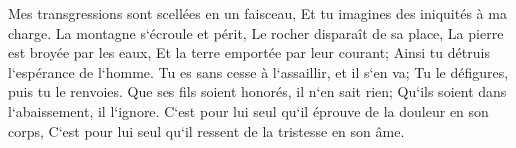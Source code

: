 \verse Mes transgressions sont scellées en un faisceau, Et tu imagines des iniquités à ma charge. 
\verse La montagne s`écroule et périt, Le rocher disparaît de sa place, 
\verse La pierre est broyée par les eaux, Et la terre emportée par leur courant; Ainsi tu détruis l`espérance de l`homme. 
\verse Tu es sans cesse à l`assaillir, et il s`en va; Tu le défigures, puis tu le renvoies. 
\verse Que ses fils soient honorés, il n`en sait rien; Qu`ils soient dans l`abaissement, il l`ignore. 
\verse C`est pour lui seul qu`il éprouve de la douleur en son corps, C`est pour lui seul qu`il ressent de la tristesse en son âme. 

